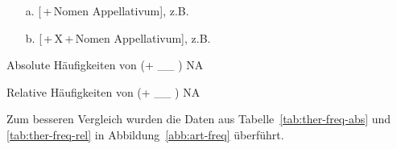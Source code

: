 \begin{itemize}
\item[a.] [\object{dër}\,+\,Nomen Appellativum], z.B. 
\item[b.] [\object{dër}\,+\,X\,+\,Nomen Appellativum],
z.B.  %
\end{itemize}

\begin{table}
\centering

\caption{Absolute Häufigkeiten von  (+ \_\_ ) NA}
\label{tab:ther-freq-abs}
\end{table}

\begin{table}
\centering

\caption{Relative Häufigkeiten von  (+ \_\_ ) NA}
\label{tab:ther-freq-rel}
\end{table}

Zum besseren Vergleich wurden die Daten aus Tabelle~\ref{tab:ther-freq-abs} und \ref{tab:ther-freq-rel} in Abbildung~\ref{abb:art-freq} überführt.  

